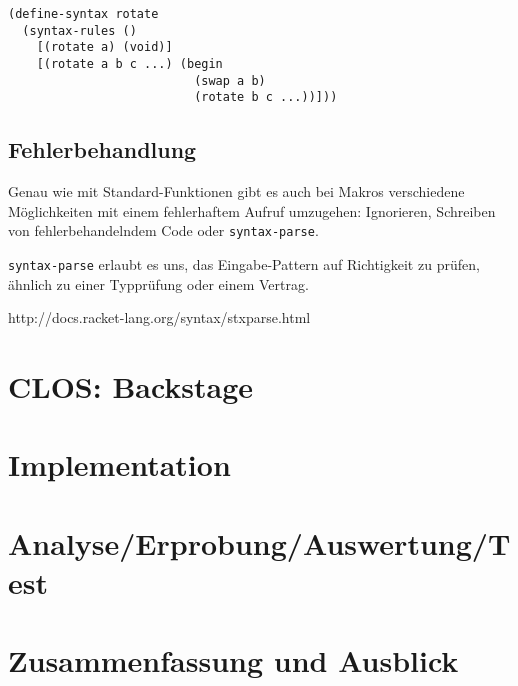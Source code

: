 \begin{lstlisting}
(define-syntax rotate
  (syntax-rules ()
    [(rotate a) (void)]
    [(rotate a b c ...) (begin
                          (swap a b)
                          (rotate b c ...))]))
\end{lstlisting}


\section{Fehlerbehandlung}
Genau wie mit Standard-Funktionen gibt es auch bei Makros verschiedene Möglichkeiten mit einem fehlerhaftem Aufruf umzugehen: Ignorieren, Schreiben von fehlerbehandelndem Code oder \texttt{syntax-parse}. 

\texttt{syntax-parse} erlaubt es uns, das Eingabe-Pattern auf Richtigkeit zu prüfen, ähnlich zu einer Typprüfung oder einem Vertrag.

http://docs.racket-lang.org/syntax/stxparse.html %


\chapter{CLOS: Backstage}
\label{cpl}


\chapter{Implementation}  %

\chapter{Analyse/Erprobung/Auswertung/Test}

\chapter{Zusammenfassung und Ausblick}






